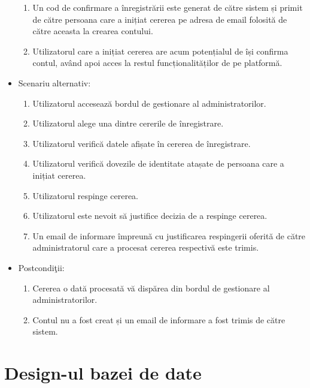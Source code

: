 \documentclass[12pt,a4paper,hidelinks]{report}
\theoremstyle{definition}
\theoremstyle{remark}
\begin{document}
\begin{itemize}
{\begin{enumerate}
            \item Un cod de confirmare a înregistrării este generat de către sistem și primit de către persoana care a inițiat cererea pe adresa de email folosită de către aceasta la crearea contului.
            \item Utilizatorul care a inițiat cererea are acum potențialul de își confirma contul, având apoi acces la restul funcționalităților de pe platformă.
        \end{enumerate}}
    \item {Scenariu alternativ:
        \begin{enumerate}
            \item Utilizatorul accesează bordul de gestionare al administratorilor.
            \item Utilizatorul alege una dintre cererile de înregistrare.
            \item Utilizatorul verifică datele afișate în cererea de înregistrare.
            \item Utilizatorul verifică dovezile de identitate atașate de persoana care a inițiat cererea.
            \item Utilizatorul respinge cererea.
            \item Utilizatorul este nevoit să justifice decizia de a respinge cererea.
            \item Un email de informare împreună cu justificarea respingerii oferită de către administratorul care a procesat cererea respectivă este trimis.
        \end{enumerate}}
    \item {Postcondi\c tii:
        \begin{enumerate}
            \item Cererea o dată procesată vă dispărea din bordul de gestionare al administratorilor.
            \item Contul nu a fost creat și un email de informare a fost trimis de către sistem.
        \end{enumerate}}
\end{itemize}
\section{Design-ul bazei de date}
\end{document}

